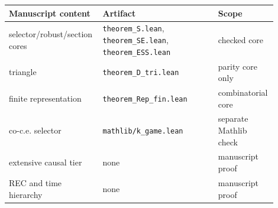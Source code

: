\documentclass[11pt]{article}
\theoremstyle{plain}
\theoremstyle{definition}
\theoremstyle{remark}
\begin{document}
\begin{center}
\begin{tabular}{@{}p{0.30\linewidth}p{0.42\linewidth}p{0.18\linewidth}@{}}
\toprule
Manuscript content & Artifact & Scope\\
\midrule
selector/robust/section cores & \texttt{theorem\_S.lean}, \texttt{theorem\_SE.lean}, \texttt{theorem\_ESS.lean} & checked core\\
triangle & \texttt{theorem\_D\_tri.lean} & parity core only\\
finite representation & \texttt{theorem\_Rep\_fin.lean} & combinatorial core\\
co-c.e. selector & \texttt{mathlib/k\_game.lean} & separate Mathlib check\\
extensive causal tier & none & manuscript proof\\
REC and time hierarchy & none & manuscript proof\\
\bottomrule
\end{tabular}
\end{center}
\end{document}
